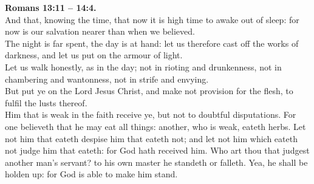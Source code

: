 \documentclass[10pt]{article} %
\begin{document}
{\begin{minipage}[t]{0.45\textwidth}
\textbf{Romans 13:11 -- 14:4.}\\
And that, knowing the time, that now it is high time to awake out of sleep: for now is our salvation nearer than when we believed.\\
The night is far spent, the day is at hand: let us therefore cast off the works of darkness, and let us put on the armour of light.\\
Let us walk honestly, as in the day; not in rioting and drunkenness, not in chambering and wantonness, not in strife and envying.\\
But put ye on the Lord Jesus Christ, and make not provision for the flesh, to fulfil the lusts thereof.\\
Him that is weak in the faith receive ye, but not to doubtful disputations.
For one believeth that he may eat all things: another, who is weak, eateth herbs.
Let not him that eateth despise him that eateth not; and let not him which eateth not judge him that eateth: for God hath received him.
Who art thou that judgest another man's servant? to his own master he standeth or falleth. Yea, he shall be holden up: for God is able to make him stand.

\end{minipage}}
\vspace*{\fill}
\newpage
\Huge%
\vspace*{\fill}
\begin{spacing}{1.4}%
\end{spacing}
\vspace*{\fill}
\end{document}
